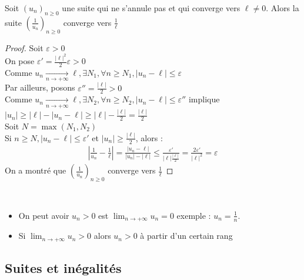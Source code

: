 \begin{graybox}
    \begin{theoreme}[]
    Soit $(u_n)_{n \geq 0}$ une suite qui ne s'annule pas et qui converge vers $\ell \neq 0$. Alors la suite $\left(\frac{1}{u_n}\right)_{n \geq 0}$ converge vers $\frac{1}{\ell}$
\end{theoreme} 
\end{graybox}

\begin{proof}
        Soit $\varepsilon > 0$ \\
        On pose $\varepsilon' = \frac{|\ell|^2}{2} \varepsilon > 0$ \\
        Comme $u_n \xrightarrow[n \to +\infty]{} \ell, \exists N_1, \forall n \geq N_1, |u_n - \ell| \leq \varepsilon$\\
        Par ailleurs, posons $\varepsilon'' = \frac{|\ell|}{2} > 0$ \\
        Comme $u_n \xrightarrow[n  \to + \infty]{} \ell, \exists N_2, \forall n \geq N_2, |u_n - \ell| \leq \varepsilon''$ implique $|u_n| \geq |\ell| - |u_n - \ell| \geq |\ell| - \frac{|\ell|}{2} = \frac{|\ell|}{2}$ \\
        Soit $N = \max(N_1, N_2)$ \\
        Si $n \geq N, |u_n - \ell| \leq \varepsilon'$ et $|u_n| \geq \frac{|\ell|}{2}$, alors : 
        \begin{align*}
            \left| \frac{1}{u_n} - \frac{1}{\ell} \right| = \frac{|u_n - \ell|}{|u_n| - |\ell|} \leq \frac{\varepsilon'}{|\ell|\frac{|\ell|}{2}} = \frac{2 \varepsilon'}{|\ell|^2} = \varepsilon
        \end{align*}
        On a montré que $\left( \frac{1}{u_n} \right)_{n \geq 0}$ converge vers $\frac{1}{\ell}$
\end{proof}

\begin{remarque}~
    \begin{itemize}
    \item On peut avoir $u_n > 0$ est $\displaystyle{\lim_{n \to +\infty} u_n = 0}$ exemple : $u_n = \frac{1}{n}$. 
    \item Si $\displaystyle{\lim_{n \to +\infty} u_n > 0}$ alors $u_n > 0$ à partir d'un certain rang
    \end{itemize}
\end{remarque}

\subsection{Suites et inégalités}


